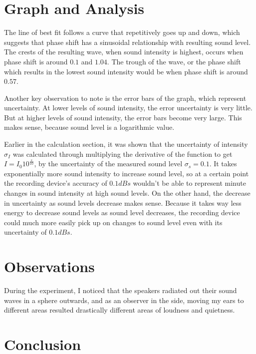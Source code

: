 \documentclass[index]{subfiles}
\begin{document}
\section{Graph and Analysis}

The line of best fit follows a curve that repetitively goes up and down, which suggests that phase shift has a sinusoidal relationship with resulting sound level. The crests of the resulting wave, when sound intensity is highest, occurs when phase shift is around \(0.1\) and \(1.04\). The trough of the wave, or the phase shift which results in the lowest sound intensity would be when phase shift is around \(0.57\).

Another key observation to note is the error bars of the graph, which represent uncertainty. At lower levels of sound intensity, the error uncertainty is very little. But at higher levels of sound intensity, the error bars become very large. This makes sense, because sound level is a logarithmic value.


Earlier in the calculation section, it was shown that the uncertainty of intensity \(\sigma_{I}\) was calculated through multiplying the derivative of the function to get \(I=I_{0}10^{\frac{s}{10}}\), by the uncertainty of the measured sound level \(\sigma_{s}=0.1\). It takes exponentially more sound intensity to increase sound level, so at a certain point the recording device's accuracy of \(0.1 dBs\) wouldn't be able to represent minute changes in sound intensity at high sound levels. On the other hand, the decrease in uncertainty as sound levels decrease makes sense. Because it takes way less energy to decrease sound levels as sound level decreases, the recording device could much more easily pick up on changes to sound level even with its uncertainty of \(0.1 dBs\).



\section{Observations}

During the experiment, I noticed that the speakers radiated out their sound waves in a sphere outwards, and as an observer in the side, moving my ears to different areas resulted drastically different areas of loudness and quietness.

\section{Conclusion}
\end{document}
